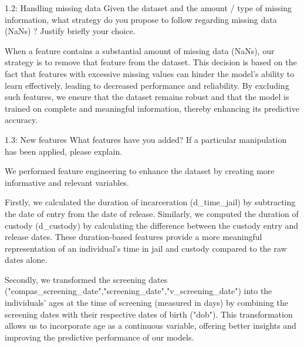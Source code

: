 \documentclass [a4paper, 12pt] {article}
\begin{document}
\begin{question}{1.2: Handling missing data}
    Given the dataset and the amount / type of missing information, what strategy do you propose to follow regarding missing data (NaNs) ? Justify briefly your choice.
\end{question}
\begin{answer}\color{blue} 
When a feature contains a substantial amount of missing data (NaNs), our strategy is to remove that feature from the dataset. This decision is based on the fact that features with excessive missing values can hinder the model's ability to learn effectively, leading to decreased performance and reliability. By excluding such features, we ensure that the dataset remains robust and that the model is trained on complete and meaningful information, thereby enhancing its predictive accuracy.

\end{answer}

\begin{question}{1.3: New features}
    What features have you added? If a particular manipulation has been applied, please explain.
\end{question}
\begin{answer}\color{blue} 
We performed feature engineering to enhance the dataset by creating more informative and relevant variables.

Firstly, we calculated the duration of incarceration (d\_time\_jail) by subtracting the date of entry from the date of release. Similarly, we computed the duration of custody (d\_custody) by calculating the difference between the custody entry and release dates. These duration-based features provide a more meaningful representation of an individual's time in jail and custody compared to the raw dates alone.

Secondly, we transformed the screening dates ("compas\_screening\_date","screening\_date","v\_screening\_date") into the individuals' ages at the time of screening (measured in days) by combining the screening dates with their respective dates of birth ("dob"). This transformation allows us to incorporate age as a continuous variable, offering better insights and improving the predictive performance of our models.
\end{answer}
\end{document}
